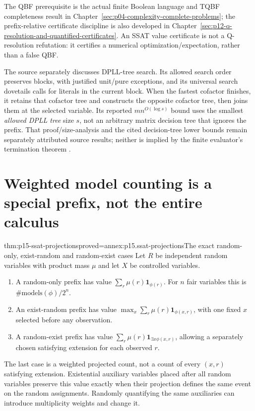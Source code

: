 The QBF prerequisite is the actual finite Boolean language and TQBF
completeness result in Chapter~\ref{sec:p04-complexity-complete-problems};
the prefix-relative certificate discipline is also developed in
Chapter~\ref{sec:p12-q-resolution-and-quantified-certificates}.
An SSAT value certificate is not a Q-resolution refutation: it certifies
a numerical optimization/expectation, rather than a false QBF.

The source separately discusses DPLL-tree search. Its allowed search
order preserves blocks, with justified unit/pure exceptions, and its
universal search dovetails calls for literals in the current block.
When the fastest cofactor finishes, it retains that cofactor tree and
constructs the opposite cofactor tree, then joins them at the selected
variable. Its reported \(m n^{O(\log s)}\) bound uses the smallest
\emph{allowed DPLL tree} size \(s\), not an arbitrary matrix decision
tree that ignores the prefix. That proof/size-analysis and the cited
decision-tree lower bounds remain separately attributed source results;
neither is implied by the finite evaluator's termination theorem
\cite[sec.~2.2, pp.~18--20]{LittmanMajercikPitassi2000SSATAuthor}.

\section{Weighted model counting is a special prefix, not the entire calculus}
\label{sec:p15-ssat-counting}

\begin{hbtheorem}{thm:p15-ssat-projections}{proved=annex:p15.ssat-projections}{The exact random-only, exist-random and random-exist cases}
Let \(R\) be independent random variables with product mass \(\mu\)
and let \(X\) be controlled variables.
\begin{enumerate}
\item A random-only prefix has value
      \(\sum_r\mu(r)\mathbf1_{\phi(r)}\). For \(n\) fair
      variables this is \(\#\mathrm{models}(\phi)/2^n\).
\item An exist-random prefix has value
      \(\max_x\sum_r\mu(r)\mathbf1_{\phi(x,r)}\), with one
      fixed \(x\) selected before any observation.
\item A random-exist prefix has value
      \(\sum_r\mu(r)\mathbf1_{\exists x\phi(x,r)}\), allowing
      a separately chosen satisfying extension for each observed \(r\).
\end{enumerate}
The last case is a weighted projected count, not a count of every
\((x,r)\) satisfying extension. Existential auxiliary variables placed
after all random variables preserve this value exactly when their
projection defines the same event on the random assignments.
Randomly quantifying the same auxiliaries can introduce multiplicity
weights and change it.
\end{hbtheorem}

